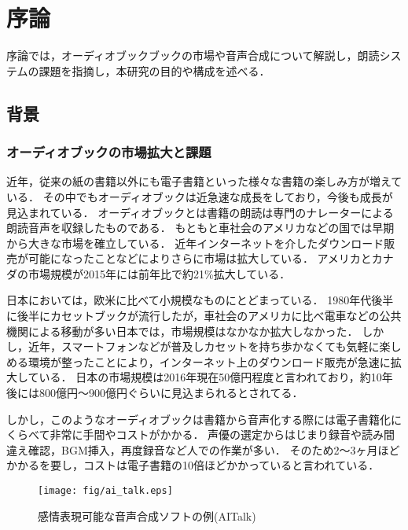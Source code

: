 \chapter{序論}
序論では，オーディオブックブックの市場や音声合成について解説し，朗読システムの課題を指摘し，本研究の目的や構成を述べる．

\section{背景}
\subsection{オーディオブックの市場拡大と課題}
近年，従来の紙の書籍以外にも電子書籍といった様々な書籍の楽しみ方が増えている．
その中でもオーディオブックは近急速な成長をしており，今後も成長が見込まれている．
オーディオブックとは書籍の朗読は専門のナレーターによる朗読音声を収録したものである．
もともと車社会のアメリカなどの国では早期から大きな市場を確立している．
近年インターネットを介したダウンロード販売が可能になったことなどによりさらに市場は拡大している．
アメリカとカナダの市場規模が2015年には前年比で約21\%拡大している\cite{wsj}．

日本においては，欧米に比べて小規模なものにとどまっている．
1980年代後半に後半にカセットブックが流行したが，車社会のアメリカに比べ電車などの公共機関による移動が多い日本では，市場規模はなかなか拡大しなかった．
しかし，近年，スマートフォンなどが普及しカセットを持ち歩かなくても気軽に楽しめる環境が整ったことにより，インターネット上のダウンロード販売が急速に拡大している．
日本の市場規模は2016年現在50億円程度と言われており，約10年後には800億円〜900億円ぐらいに見込まられるとされてる．\cite{cnet}

しかし，このようなオーディオブックは書籍から音声化する際には電子書籍化にくらべて非常に手間やコストがかかる．
声優の選定からはじまり録音や読み間違え確認，BGM挿入，再度録音など人での作業が多い．
そのため2〜3ヶ月ほどかかるを要し，コストは電子書籍の10倍ほどかかっていると言われている．\cite{ueda}

\begin{figure}[ht]
  \begin{center}
    \texttt{[image: fig/ai\_talk.eps]}
    \caption{感情表現可能な音声合成ソフトの例(AITalk)}
    \label{fig:ai_talk}
  \end{center}
\end{figure}

